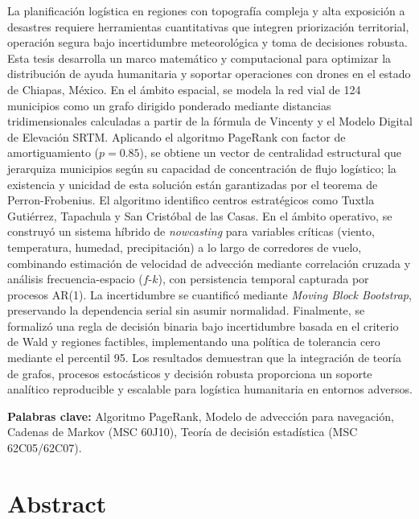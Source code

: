 \documentclass[
  spanish,
  us-letterpaper,
]{scrreprt}
\numberwithin{equation}{section}
\begin{document}

La planificación logística en regiones con topografía compleja y alta
exposición a desastres requiere herramientas cuantitativas que integren
priorización territorial, operación segura bajo incertidumbre
meteorológica y toma de decisiones robusta. Esta tesis desarrolla un
marco matemático y computacional para optimizar la distribución de ayuda
humanitaria y soportar operaciones con drones en el estado de Chiapas,
México. En el ámbito espacial, se modela la red vial de 124 municipios
como un grafo dirigido ponderado mediante distancias tridimensionales
calculadas a partir de la fórmula de Vincenty y el Modelo Digital de
Elevación SRTM. Aplicando el algoritmo PageRank con factor de
amortiguamiento (\(p=0.85\)), se obtiene un vector de centralidad
estructural que jerarquiza municipios según su capacidad de
concentración de flujo logístico; la existencia y unicidad de esta
solución están garantizadas por el teorema de Perron-Frobenius. El
algoritmo identifico centros estratégicos como Tuxtla Gutiérrez,
Tapachula y San Cristóbal de las Casas. En el ámbito operativo, se
construyó un sistema híbrido de \emph{nowcasting} para variables
críticas (viento, temperatura, humedad, precipitación) a lo largo de
corredores de vuelo, combinando estimación de velocidad de advección
mediante correlación cruzada y análisis frecuencia-espacio
(\(f\)-\(k\)), con persistencia temporal capturada por procesos AR(1).
La incertidumbre se cuantificó mediante \emph{Moving Block Bootstrap},
preservando la dependencia serial sin asumir normalidad. Finalmente, se
formalizó una regla de decisión binaria bajo incertidumbre basada en el
criterio de Wald y regiones factibles, implementando una política de
tolerancia cero mediante el percentil 95. Los resultados demuestran que
la integración de teoría de grafos, procesos estocásticos y decisión
robusta proporciona un soporte analítico reproducible y escalable para
logística humanitaria en entornos adversos.

\textbf{Palabras clave:} Algoritmo PageRank, Modelo de advección para
navegación, Cadenas de Markov (MSC 60J10), Teoría de decisión
estadística (MSC 62C05/62C07).

\section*{Abstract}\label{abstract}

\end{document}
